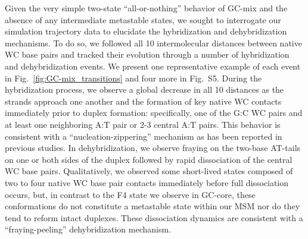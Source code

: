 \documentclass[journal=jpcbfk,manuscript=article]{achemso}
\newcommand*{\blauw}[1]{{#1}}
\begin{document}
Given the very simple two-state ``all-or-nothing'' behavior of GC-mix and the absence of any intermediate metastable states, we sought to interrogate our simulation trajectory data to elucidate the hybridization and dehybridization mechanisms. To do so, we followed all 10 intermolecular distances between native WC base pairs and tracked their evolution through a number of hybridization and dehybridization events. We present one representative example of each event in Fig.~\ref{fig:GC-mix_transitions} and four more in \blauw{Fig.~S5}. During the hybridization process, we observe a global decrease in all 10 distances as the strands approach one another and the formation of key native WC contacts immediately prior to duplex formation: specifically, one of the G:C WC pairs and at least one neighboring A:T pair or 2-3 central A:T pairs. This behavior is consistent with a ``nucleation-zippering'' mechanism as has been reported in previous studies.\citep{Wetmur1968KineticsDNA, Porschke1971CooperativeTransition, Sambriski2009SequencePathways,  Yin2011KineticsHybridization} In dehybridization, we observe fraying on the two-base AT-tails on one or both sides of the duplex followed by rapid dissociation of the central WC base pairs. Qualitatively, we observed some short-lived states composed of two to four native WC base pair contacts immediately before full dissociation occurs, but, in contrast to the F4 state we observe in GC-core, these conformations do not constitute a metastable state within our MSM nor do they tend to reform intact duplexes. These dissociation dynamics are consistent with a ``fraying-peeling'' dehybridization mechanism.\citep{Wong2008TheSimulations, Perez2010Real-timeUnfolding, Zgarbova2014BaseRNA} 
\end{document}
